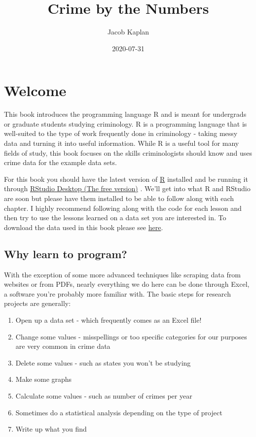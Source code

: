 \documentclass[
  12pt,
]{book}
\title{Crime by the Numbers}
\author{Jacob Kaplan}
\date{2020-07-31}
\providecommand{\tightlist}{%
  \setlength{\itemsep}{0pt}\setlength{\parskip}{0pt}}
\begin{document}
\maketitle

{
\hypersetup{linkcolor=}
\setcounter{tocdepth}{2}
\tableofcontents
}
\hypertarget{welcome}{%
\chapter*{Welcome}\label{welcome}}


This book introduces the programming language R and is meant for undergrads or graduate students studying criminology. R is a programming language that is well-suited to the type of work frequently done in criminology - taking messy data and turning it into useful information. While R is a useful tool for many fields of study, this book focuses on the skills criminologists should know and uses crime data for the example data sets.

For this book you should have the latest version of \href{https://cloud.r-project.org/}{R} installed and be running it through \href{https://www.rstudio.com/products/rstudio/download/}{RStudio Desktop (The free version)} . We'll get into what R and RStudio are soon but please have them installed to be able to follow along with each chapter. I highly recommend following along with the code for each lesson and then try to use the lessons learned on a data set you are interested in. To download the data used in this book please see \href{https://github.com/jacobkap/r4crimz/tree/master/data}{here}.

\hypertarget{why-learn-to-program}{%
\section*{Why learn to program?}\label{why-learn-to-program}}


With the exception of some more advanced techniques like scraping data from websites or from PDFs, nearly everything we do here can be done through Excel, a software you're probably more familiar with. The basic steps for research projects are generally:

\begin{enumerate}
\def\labelenumi{\arabic{enumi}.}
\tightlist
\item
  Open up a data set - which frequently comes as an Excel file!
\item
  Change some values - misspellings or too specific categories for our purposes are very common in crime data
\item
  Delete some values - such as states you won't be studying
\item
  Make some graphs
\item
  Calculate some values - such as number of crimes per year
\item
  Sometimes do a statistical analysis depending on the type of project
\item
  Write up what you find
\end{enumerate}
\end{document}
